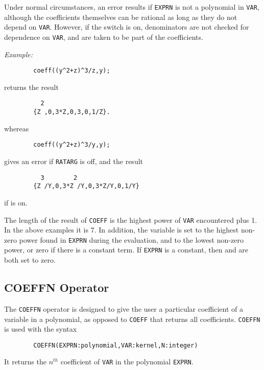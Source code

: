 Under normal circumstances, an error results if \texttt{EXPRN} is not a
polynomial in \texttt{VAR}, although the coefficients themselves can be
rational as long as they do not depend on \texttt{VAR}.  However, if the
switch  is on, denominators are not checked for
dependence on \texttt{VAR}, and are taken to be part of the coefficients.

\textit{Example:}
\begin{verbatim}
        coeff((y^2+z)^3/z,y);
\end{verbatim}
returns the result
\begin{verbatim}
          2
        {Z ,0,3*Z,0,3,0,1/Z}.
\end{verbatim}
whereas
\begin{verbatim}
        coeff((y^2+z)^3/y,y);
\end{verbatim}
gives an error if \texttt{RATARG} is off, and the result
\begin{verbatim}
          3        2
        {Z /Y,0,3*Z /Y,0,3*Z/Y,0,1/Y}
\end{verbatim}
if  is on.

\hypertarget{reserved:HIGH_POW}{}
\hypertarget{reserved:LOW_POW}{}
The length of the result of \texttt{COEFF} is the highest power of \texttt{VAR}
encountered plus 1.  In the above examples it is 7.  In addition, the
variable  is set to the highest non-zero
power found in \texttt{EXPRN} during the evaluation, and 
 to the lowest non-zero power, or zero if there is a
constant term.  If \texttt{EXPRN} is a constant, then  and
 are both set to zero.

\subsection{COEFFN Operator}
\hypertarget{operator:COEFFN}{}

The \texttt{COEFFN} operator is designed to give the user a particular
coefficient of a variable in a polynomial, as opposed to \texttt{COEFF} that
returns all coefficients. \texttt{COEFFN} is used with the syntax
\begin{verbatim}
        COEFFN(EXPRN:polynomial,VAR:kernel,N:integer)
\end{verbatim}
It returns the $n^{th}$ coefficient of \texttt{VAR} in the polynomial
\texttt{EXPRN}.

